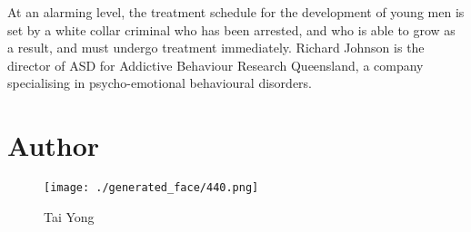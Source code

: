 \documentclass{article}%
\begin{document}
At an alarming level, the treatment schedule for the development of young men is set by a white collar criminal who has been arrested, and who is able to grow as a result, and must undergo treatment immediately.\newline%
Richard Johnson is the director of ASD for Addictive Behaviour Research Queensland, a company specialising in psycho{-}emotional behavioural disorders.\newline%

%
\section{Author}%
\label{sec:Author}%


\begin{figure}[h!]%
\centering%
\texttt{[image: ./generated\_face/440.png]}%
\caption{Tai Yong}%
\end{figure}

%
\end{document}

